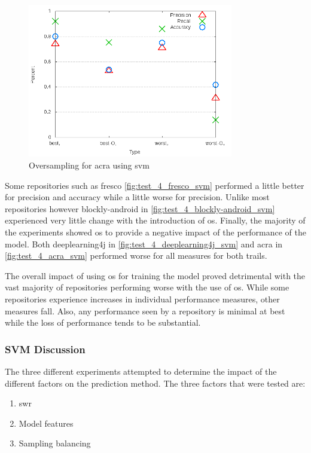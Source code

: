 \begin{figure}[!ht]
    \centering

        \includegraphics[width=0.8\textwidth]{images/svm/test_4/acra_sample_range}
        \caption{Oversampling for acra using \gls{svm}}
        \label{fig:test_4_acra_svm}
\end{figure}


Some repositories such as fresco \autoref{fig:test_4_fresco_svm} performed a little better for precision and accuracy while a little worse for precision. Unlike most repositories however blockly-android in \autoref{fig:test_4_blockly-android_svm} experienced very little change with the introduction of \gls{os}. Finally, the majority of the experiments showed \gls{os} to provide a negative impact of the performance of the model. Both deeplearning4j in \autoref{fig:test_4_deeplearning4j_svm} and acra in \autoref{fig:test_4_acra_svm} performed worse for all measures for both trails.

The overall impact of using \gls{os} for training the model proved detrimental with the vast majority of repositories performing worse with the use of \gls{os}. While some repositories experience increases in individual performance measures, other measures fall. Also, any performance seen by a repository is minimal at best while the loss of performance tends to be substantial.

\subsubsection{SVM Discussion}
\label{subsec:svm_discussion}

The three different experiments attempted to determine the impact of the different factors on the prediction method. The three factors that were tested are:
\begin{enumerate}
\item \gls{swr}
\item Model features
\item Sampling balancing
\end{enumerate}

